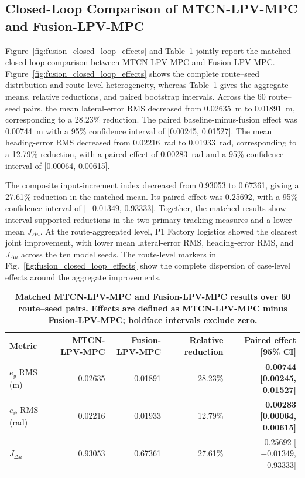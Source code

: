 \documentclass{ieeeaccess}
\begin{document}
\subsection{Closed-Loop Comparison of MTCN-LPV-MPC and Fusion-LPV-MPC}
\label{subsec:fusion_closed_loop_comparison}

Figure~\ref{fig:fusion_closed_loop_effects} and Table~\ref{tab:five_source_closed_loop}
jointly report the matched closed-loop comparison between MTCN-LPV-MPC and
Fusion-LPV-MPC. Figure~\ref{fig:fusion_closed_loop_effects} shows the complete
route--seed distribution and route-level heterogeneity, whereas
Table~\ref{tab:five_source_closed_loop} gives the aggregate means, relative
reductions, and paired bootstrap intervals. Across the 60 route--seed
pairs, the mean lateral-error RMS decreased from 0.02635~m to 0.01891~m,
corresponding to a 28.23\% reduction. The paired baseline-minus-fusion effect was
0.00744~m with a 95\% confidence interval of [0.00245, 0.01527]. The mean
heading-error RMS decreased from 0.02216~rad to 0.01933~rad, corresponding to
a 12.79\% reduction, with a paired effect of 0.00283~rad and a 95\% confidence
interval of [0.00064, 0.00615].

The composite input-increment index decreased from 0.93053 to 0.67361, giving
a 27.61\% reduction in the matched mean. Its paired effect was 0.25692, with a
95\% confidence interval of [$-0.01349$, 0.93333]. Together, the matched results
show interval-supported reductions in the two primary tracking measures and a
lower mean $J_{\Delta u}$. At the route-aggregated level, P1 Factory logistics
showed the clearest joint improvement, with lower mean lateral-error RMS,
heading-error RMS, and $J_{\Delta u}$ across the ten model seeds. The
route-level markers in Fig.~\ref{fig:fusion_closed_loop_effects} show the
complete dispersion of case-level effects around the aggregate improvements.

\begin{table}[!tbp]
\centering
\caption{\textbf{Matched MTCN-LPV-MPC and Fusion-LPV-MPC results over 60 route--seed pairs. Effects are defined as MTCN-LPV-MPC minus Fusion-LPV-MPC; boldface intervals exclude zero.}}
\label{tab:five_source_closed_loop}
\scriptsize
\setlength{\tabcolsep}{4pt}
\begin{tabular}{|l|r|r|r|r|}
\hline
Metric & MTCN-LPV-MPC & Fusion-LPV-MPC & Relative reduction & Paired effect [95\% CI] \\
\hline
$e_y$ RMS (m)
& 0.02635 & 0.01891 & 28.23\%
& \textbf{0.00744 [0.00245, 0.01527]} \\
$e_\psi$ RMS (rad)
& 0.02216 & 0.01933 & 12.79\%
& \textbf{0.00283 [0.00064, 0.00615]} \\
$J_{\Delta u}$
& 0.93053 & 0.67361 & 27.61\%
& 0.25692 [$-0.01349$, 0.93333] \\
\hline
\end{tabular}
\end{table}
\end{document}
